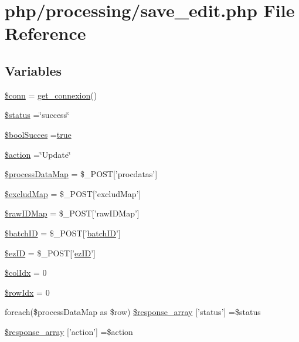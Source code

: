 \hypertarget{save__edit_8php}{\section{php/processing/save\-\_\-edit.php File Reference}
\label{save__edit_8php}
}
\subsection*{Variables}
\begin{DoxyCompactItemize}
\item 
\hyperlink{save__edit_8php_aa8a5a87b9c1a6a0819b88447cbe41877}{\$conn} = \hyperlink{php__functions_8php_ace18bc10f3fd08f92688ac743e0d8c2e}{get\-\_\-connexion}()
\item 
\hyperlink{save__edit_8php_a58391ea75f2d29d5d708d7050b641c33}{\$status} =\char`\"{}success\char`\"{}
\item 
\hyperlink{save__edit_8php_a538eaf07e91a8c4f140bc04fa2b899cf}{\$bool\-Succes} =\hyperlink{obsolete_2processing__bak_8php_ad85b26c88897c4f65b1a4930711a2e93}{true}
\item 
\hyperlink{save__edit_8php_aa698a3e72116e8e778be0e95d908ee30}{\$action} =\char`\"{}Update\char`\"{}
\item 
\hyperlink{save__edit_8php_afa1bf54e96740365ed27d1d6e502ebe6}{\$process\-Data\-Map} = \$\-\_\-\-P\-O\-S\-T\mbox{[}'procdatas'\mbox{]}
\item 
\hyperlink{save__edit_8php_a296195c83717b71c16843c3c951e29a2}{\$exclud\-Map} = \$\-\_\-\-P\-O\-S\-T\mbox{[}'exclud\-Map'\mbox{]}
\item 
\hyperlink{save__edit_8php_a2c543a123b646cdf11c814983d4a13cf}{\$raw\-I\-D\-Map} = \$\-\_\-\-P\-O\-S\-T\mbox{[}'raw\-I\-D\-Map'\mbox{]}
\item 
\hyperlink{save__edit_8php_aaa6d122ea9cb55b210aadd86e5654a74}{\$batch\-I\-D} = \$\-\_\-\-P\-O\-S\-T\mbox{[}'\hyperlink{obsolete_2processing__bak_8php_a88c5bc4262b7c34f236357f5c53fc99b}{batch\-I\-D}'\mbox{]}
\item 
\hyperlink{save__edit_8php_addb1ec3ba55e413a08cb006ce21974df}{\$ez\-I\-D} = \$\-\_\-\-P\-O\-S\-T\mbox{[}'\hyperlink{admin_rawdata_8php_adf465cadf95987152966d26567509f92}{ez\-I\-D}'\mbox{]}
\item 
\hyperlink{save__edit_8php_a4deb48a7e93f5e779e135128a3d1ac1b}{\$col\-Idx} = 0
\item 
\hyperlink{save__edit_8php_a2457f3fab8183bd163626612df265a7e}{\$row\-Idx} = 0
\item 
foreach(\$process\-Data\-Map as \$row) \hyperlink{save__edit_8php_a4ba95aec8cb028451e78a65b37d972d7}{\$response\-\_\-array} \mbox{[}'status'\mbox{]} =\$status
\item 
\hyperlink{save__edit_8php_ae768978a0cdc416c0d63d798c85c8784}{\$response\-\_\-array} \mbox{[}'action'\mbox{]} =\$action
\end{DoxyCompactItemize}


